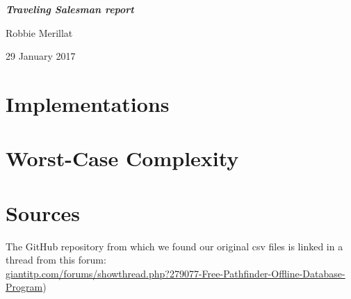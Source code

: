 \documentclass[11pt]{article}
\begin{document}
\begin{titlepage}
\vspace*{\fill}
{
    \centering
    \bfseries
    \emph{\Huge Traveling Salesman report}
    \vskip 1.5in

    \Large Robbie Merillat \\
    \vskip 2in

    29 January 2017

}
\vspace*{\fill}
\clearpage
\end{titlepage}

\section{Implementations}


\section{Worst-Case Complexity}


\newpage

\section*{Sources}
The GitHub repository from which we found our original csv files is linked in
a thread from this forum: \\
\url{giantitp.com/forums/showthread.php?279077-Free-Pathfinder-Offline-Database-Program})
\end{document}
